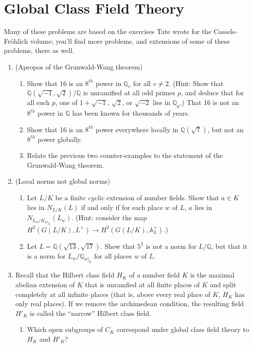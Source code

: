 \documentclass[11pt,answers,addpoints,reqno]{exam}
\theoremstyle{definition}
\theoremstyle{remark}
\theoremstyle{definition}
\theoremstyle{remark}
\theoremstyle{remark}
\theoremstyle{remark}
\newcommand{\Q}{\mathbb{Q}}
\begin{document}
\section{Global Class Field Theory}
Many of these problems are based on the exercises Tate wrote for the Cassels-Fr\"{o}hlich volume; you'll find more problems, and extensions of some of these problems, there as well.
\begin{enumerate}
 \item (Apropos of the Grunwald-Wang theorem) 
\begin{enumerate} 
\item Show that 16 is an $8^{th}$ power in $\Q_v$ for all $v \neq 2$. (Hint: Show that $\Q(\sqrt{-1}, \sqrt{2})/\Q$ is unramified at all odd primes $p$, and deduce that for all such $p$, one of $1+\sqrt{-1}$, $\sqrt{2}$, or $\sqrt{-2}$ lies in $\Q_p$.) That 16 is not an $8^{th}$ power in $\Q$ has been known for thousands of years.
\item Show that 16 is an $8^{th}$ power everywhere locally in $\Q(\sqrt{7})$, but not an $8^{th}$ power globally.
\item Relate the previous two counter-examples to the statement of the Grunwald-Wang theorem.
\end{enumerate} 
\item (Local norms not global norms)
\begin{enumerate}
\item Let $L/K$ be a finite \textit{cyclic} extension of number fields. Show that $a \in K$ lies in $N_{L/K}(L)$ if and only if for each place $w$ of $L$, $a$ lies in $N_{L_w/K_{w|_K}}(L_w)$. (Hint: consider the map $H^2(G(L/K), L^{\times}) \to H^2(G(L/K), \mathbb{A}_L^{\times})$.)
\item Let $L= \Q(\sqrt{13}, \sqrt{17})$. Show that $5^2$ is not a norm for $L/\Q$, but that it is a norm for $L_w/\Q_{w|_{\Q}}$ for all places $w$ of $L$.
\end{enumerate}
\item Recall that the Hilbert class field $H_K$ of a number field $K$ is the maximal abelian extension of $K$ that is unramfied at all finite places of $K$ and split completely at all infinite places (that is, above every real place of $K$, $H_K$ has only real places). If we remove the archimedean condition, the resulting field $H'_K$ is called the ``narrow'' Hilbert class field.
\begin{enumerate}
\item Which open subgroups of $C_K$ correspond under global class field theory to $H_K$ and $H'_K$?  

\end{enumerate}
\end{enumerate}
\end{document}
